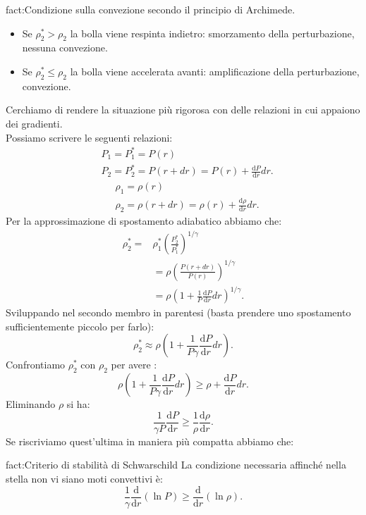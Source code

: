 \begin{fact}{fact:Condizione sulla convezione secondo il principio di Archimede.}
	\begin{itemize}
	\item Se $\rho _2^* > \rho _2$ la bolla viene respinta indietro: smorzamento 
		della perturbazione, nessuna convezione.
	\item Se $\rho _2^* \le  \rho _2$ la bolla viene accelerata avanti: amplificazione
		della perturbazione, convezione.
	\end{itemize}
\end{fact}
Cerchiamo di rendere la situazione più rigorosa con delle relazioni in cui appaiono dei gradienti.\\
Possiamo scrivere le seguenti relazioni:
\[\begin{aligned}
	&P_1=P_1^*=P(r)\\
	&P_2=P_2^* = P(r+dr)=P(r)+\frac{\mbox{d} P}{\mbox{d} r} dr
.\end{aligned}\]
\[\begin{aligned}
	&\rho _1=\rho (r)\\
	&\rho _2=\rho (r+dr)=\rho(r)+\frac{\mbox{d} \rho }{\mbox{d} r} dr
.\end{aligned}\]
Per la approssimazione di spostamento adiabatico abbiamo che:
\[\begin{aligned}
	\rho _2^*=&\rho _1^*\left( \frac{P_2^*}{P_1^{*}} \right)^{1/\gamma}\\
		  &= \rho \left( \frac{P(r+dr)}{P(r)} \right)^{1/\gamma} \\
		  &= \rho \left( 1 + \frac{1}{P}\frac{\mbox{d} P}{\mbox{d} r} dr \right)^{1/\gamma} 
.\end{aligned}\]
Sviluppando nel secondo membro in parentesi (basta prendere uno spostamento sufficientemente piccolo per farlo):
\[
	\rho _2^* \approx 
	\rho \left( 1+\frac{1}{P\gamma}\frac{\mbox{d} P}{\mbox{d} r} dr \right)
.\] 
Confrontiamo $\rho _2^*$ con $\rho _2$ per avere :
\[
	\rho \left(1 + \frac{1}{P\gamma}\frac{\mbox{d} P}{\mbox{d} r} dr \right) 
	\ge \rho + \frac{\mbox{d} P}{\mbox{d} r} dr
.\] 
Eliminando $\rho $ si ha:
\[
	\frac{1}{\gamma P}\frac{\mbox{d} P}{\mbox{d} r} 
	\ge \frac{1}{\rho }\frac{\mbox{d} \rho }{\mbox{d} r} 
.\] 
Se riscriviamo quest'ultima in maniera più compatta abbiamo che:
\begin{fact}{fact:Criterio di stabilità di Schwarschild}
	La condizione necessaria affinché nella stella non vi siano moti convettivi è:
	\[
		\frac{1}{\gamma}\frac{\mbox{d} }{\mbox{d} r} \left( \ln P \right) 
		\ge 
		\frac{\mbox{d} }{\mbox{d} r} \left( \ln \rho  \right) 
	.\] 
\end{fact}	
